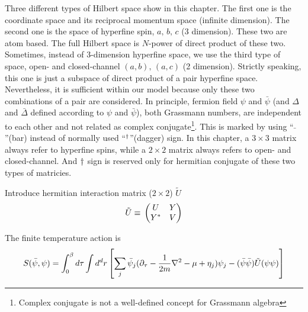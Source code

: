 Three different types of Hilbert space show in this chapter.   The first one is the coordinate space and its reciprocal momentum space (infinite dimension).   The second one is the space of hyperfine spin, $a,\,b,\,c$ (3 dimension).   These two are atom based.  The full Hilbert space is $N$-power of direct product of these two.  Sometimes, instead of 3-dimension hyperfine space, we use the third type of space, open- and closed-channel $(a,b),\,(a,c)$ (2 dimension).  Strictly speaking, this one is just a subspace of direct product of a pair hyperfine space.  Nevertheless,  it is sufficient within our model because only these two combinations of a pair are considered.    In principle, fermion field $\psi$ and $\bar\psi$ (and $\Delta$ and $\bar\Delta$ defined according to $\psi$ and $\bar\psi$),  both Grassmann numbers, are independent to each other  and  not related as complex conjugate\footnote{Complex conjugate is not a well-defined concept for Grassmann algebra}.  This is marked by using ``$\bar{\;}$''(bar) instead of normally used ``$^{\dagger}$''(dagger) sign. In this chapter, a $3\times3$ matrix always refer to hyperfine spins, while a $2\times2$ matrix always refers to  open- and closed-channel.  And $^{}\dagger$ sign  is reserved only for hermitian conjugate of these two types of matricies. 

Introduce hermitian interaction matrix ($2\times2$) $\tilde{U}$
\begin{equation}
\tilde{U}\equiv{}\begin{pmatrix}U&Y\\Y^{*}&V\end{pmatrix}
\end{equation}

The finite temperature action is 
\begin{equation}\label{eq:pathInt2:actionFermi}
S(\bar\psi,\psi)=\int^{\beta}_{0}d\tau\int{d^{d}r}\left[\sum_{j}\bar\psi_{j}(\partial_\tau-\frac{1}{2m}\nabla^{2}-\mu+\eta_{j})\psi_{j}
-(\bar\psi\bar\psi)\tilde{U}(\psi\psi)\right]
\end{equation}

